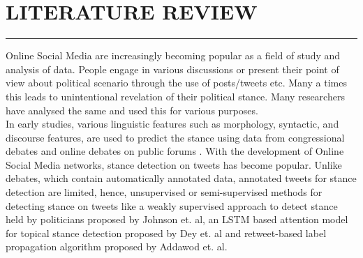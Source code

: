 \documentclass[a4paper,11pt]{article}
\begin{document}
\section{LITERATURE REVIEW}
\hrule
\vspace*{5mm}
Online Social Media are increasingly becoming popular as a field of study and analysis of data. People engage in various discussions or present their point of view about political scenario through the use of posts/tweets etc. Many a times this leads to unintentional revelation of their political stance. Many researchers have analysed the same and used this for various purposes.
\medskip\\
In early studies, various linguistic features such as morphology, syntactic, and discourse features, are used to predict the stance using data from congressional debates \cite{thomas2006get}\cite{bansal2008power} and online debates on public forums \cite{somasundaran2009recognizing}\cite{murakami2010support}\cite{anand2011cats}\cite{walker2012stance}.
With the development of Online Social Media networks, stance detection on tweets has become popular\cite{johnson2016identifying}\cite{volkova2015inferring}\cite{lukasik2016hawkes}\cite{zubiaga2016stance}. Unlike debates, which contain automatically annotated data, annotated tweets for stance detection are limited, hence, unsupervised or semi-supervised methods for detecting stance on tweets like a weakly supervised approach to detect stance held by politicians proposed by Johnson et. al\cite{johnson2016identifying}, an LSTM based attention model for topical stance detection proposed by Dey et. al\cite{dey2018topical} and retweet-based label propagation algorithm proposed by Addawod et. al\cite{addawood2017stance}.
\medskip\\
\end{document}
